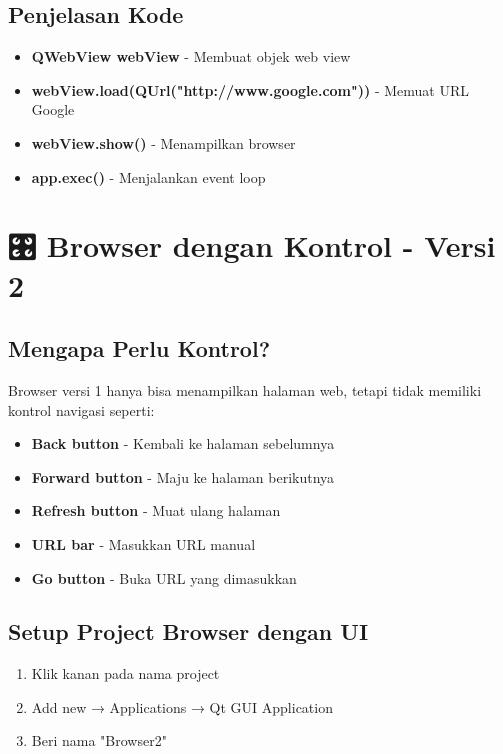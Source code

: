 \subsection{Penjelasan Kode}

\begin{itemize}
\item \textbf{QWebView webView} - Membuat objek web view
\item \textbf{webView.load(QUrl("http://www.google.com"))} - Memuat URL Google
\item \textbf{webView.show()} - Menampilkan browser
\item \textbf{app.exec()} - Menjalankan event loop
\end{itemize}

\section{🎛️ Browser dengan Kontrol - Versi 2}

\subsection{Mengapa Perlu Kontrol?}

Browser versi 1 hanya bisa menampilkan halaman web, tetapi tidak memiliki kontrol navigasi seperti:
\begin{itemize}
\item \textbf{Back button} - Kembali ke halaman sebelumnya
\item \textbf{Forward button} - Maju ke halaman berikutnya
\item \textbf{Refresh button} - Muat ulang halaman
\item \textbf{URL bar} - Masukkan URL manual
\item \textbf{Go button} - Buka URL yang dimasukkan
\end{itemize}

\subsection{Setup Project Browser dengan UI}

\begin{enumerate}
\item Klik kanan pada nama project
\item Add new → Applications → Qt GUI Application
\item Beri nama "Browser2"
\end{enumerate}


